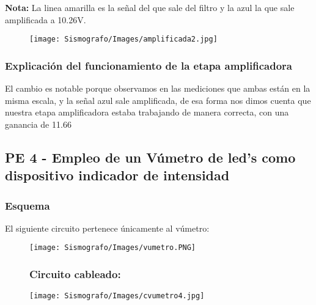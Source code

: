 \documentclass[12pt]{article}
\begin{document}
            \textbf{Nota:} La linea amarilla es la señal del que sale del filtro y la azul la que sale amplificada a 10.26V.
	        \begin{figure}[h!]
                \centering
                \texttt{[image: Sismografo/Images/amplificada2.jpg]}
            \end{figure} 
	       \newpage
	         \subsubsection{Explicación del funcionamiento de la etapa amplificadora}
	        El cambio es notable porque observamos en las mediciones que ambas están en la misma escala, y la señal azul sale amplificada, de esa forma nos dimos cuenta que nuestra etapa amplificadora estaba trabajando de manera correcta, con una ganancia de 11.66
	        \newpage
	    \subsection{PE 4 - Empleo de un Vúmetro de led's como dispositivo indicador de intensidad}
	        
	        \subsubsection{Esquema}
	        El siguiente circuito pertenece únicamente al vúmetro:
	        
	        \begin{figure}[h!]
                \centering
                \texttt{[image: Sismografo/Images/vumetro.PNG]}
            \end{figure} 
            
            \begin{figure}[h!]
            \subsubsection{Circuito cableado:}
                \centering
                \texttt{[image: Sismografo/Images/cvumetro4.jpg]}
            \end{figure}
            
\end{document}
